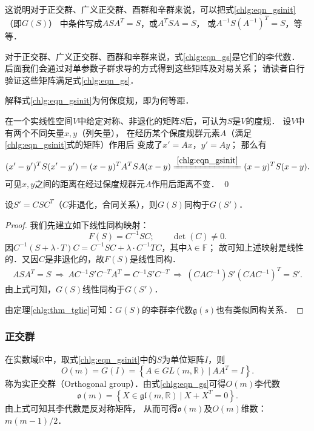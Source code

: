 这说明对于正交群、广义正交群、酉群和辛群来说，可以把式\eqref{chlg:eqn_gsinit}（即$G(S)$）
中条件写成$ A S {A}^T =S$，或$ {A}^T S A =S$，
或$  A^{-1} S ({A^{-1}})^T =S$，等等．

对于正交群、广义正交群、酉群和辛群来说，式\eqref{chlg:eqn_gs}是它们的李代数．
后面我们会通过对单参数子群求导的方式得到这些矩阵及对易关系；
请读者自行验证这些矩阵满足式\eqref{chlg:eqn_gs}．

\begin{example}
    解释式\eqref{chlg:eqn_gsinit}为何保度规，即为何等距．
    
    在一个实线性空间$V$中给定对称、非退化的矩阵$S$后，可认为$S$是$V$的度规．
    设$V$中有两个不同矢量$x,y$（列矢量），
    在经历某个保度规群元素$A$（满足\eqref{chlg:eqn_gsinit}式的矩阵）作用后
    变成了$x'=Ax$，$y'= Ay$；    那么有
    \begin{equation*}
        (x'-y')^T S (x'-y') = (x-y)^T A^T S A (x-y)
        \xlongequal{\ref{chlg:eqn_gsinit}}  (x-y)^T S (x-y).
    \end{equation*}
    可见$x,y$之间的距离在经过保度规群元$A$作用后{\kaishu 距离不变}． \qed
\end{example}


\begin{proposition}
    设$S'= C S C^T $（$C$非退化，合同关系），则$G(S)$同构于$G(S')$．
\end{proposition}
\begin{proof}
    我们先建立如下线性同构映射：
    \begin{equation}
        F(S)=C^{-1}SC;\qquad \det(C)\neq 0.
    \end{equation}    
    因$C^{-1}(S+\lambda \cdot T)C= C^{-1}SC +\lambda \cdot C^{-1}TC $，其中$\lambda\in \mathbb{F}$；
    故可知上述映射是线性的．又因$C$是非退化的，故$F(S)$是线性同构．    
    \begin{align*}
        AS A^T = S \ \Rightarrow\ A C^{-1}S' C^{-T} A^T = C^{-1}S' C^{-T}
        \ \Rightarrow\ (CA C^{-1}) S' (C A C^{-1})^{T} = S'  .
    \end{align*}
    由上式可知，$G(S)$线性同构于$G(S')$．
    
    由定理\ref{chlg:thm_tglie}可知：$G(S)$的李群李代数$\mathfrak{g}(s)$也有类似同构关系．
\end{proof}




\subsubsection{正交群}\label{chlg:sec_Orthogonal}
在实数域$\mathbb{R}$中，取式\eqref{chlg:eqn_gsinit}中的$S$为单位矩阵$I$，则
\begin{equation}\label{chlg:eqn_LG-Om}
    O(m) = G(I)= \left\{ A \in GL(m,\mathbb{R})\ |\ A A^T =I \right\}.
\end{equation}
称为实{\heiti 正交群}（Orthogonal group）．由式\eqref{chlg:eqn_gs}可得$O(m)$李代数
\begin{equation}\label{chlg:eqn_LA-om}
    \mathfrak{o}(m) = \left\{ X \in \mathfrak{gl}(m,\mathbb{R}) \ | \ 
    X  +  X^T = 0 \right\} .
\end{equation}
由上式可知其李代数是反对称矩阵，
从而可得$\mathfrak{o}(m)$及$O(m)$维数：$m(m-1)/2$．

